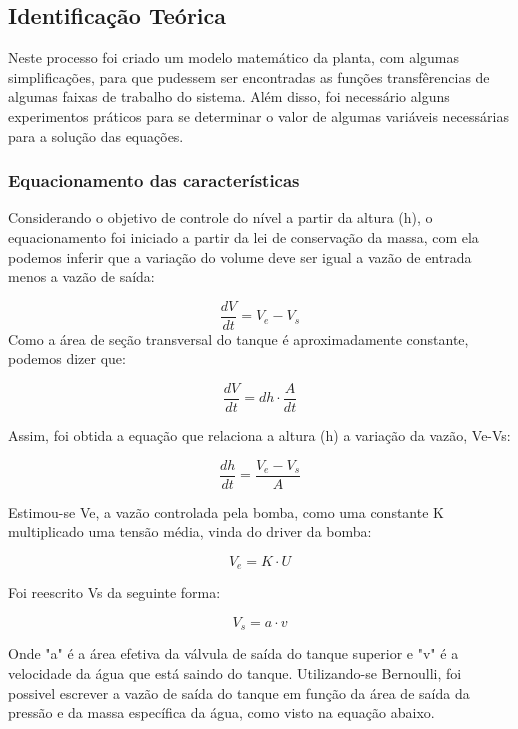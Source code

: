 \subsection{Identificação Teórica}

Neste processo foi criado um modelo matemático da planta, com algumas simplificações, para que pudessem ser encontradas as funções transfêrencias de algumas faixas de trabalho do sistema. Além disso, foi necessário alguns experimentos práticos para se determinar o valor de algumas variáveis necessárias para a solução das equações.

\subsubsection{Equacionamento das características}

Considerando o objetivo de controle do nível a partir da altura (h), o equacionamento foi iniciado a partir da lei de conservação da massa, com ela podemos inferir que a variação do volume deve ser igual a vazão de entrada menos a vazão de saída: 

\begin{equation}
    \dfrac{dV}{dt} = V_e - V_s
\end{equation}
Como a área de seção transversal do tanque é aproximadamente constante, podemos dizer que:


\begin{equation}
    \dfrac{dV}{dt} = dh \cdot \dfrac{A}{dt}
\end{equation}

Assim, foi obtida a equação que relaciona a altura (h) a variação da vazão, Ve-Vs:


\begin{equation}
    \dfrac{dh}{dt} = \dfrac{V_e - V_s}{A}
\end{equation}

Estimou-se Ve, a vazão controlada pela bomba, como uma constante K multiplicado uma tensão média, vinda do driver da bomba:


\begin{equation}
    V_e = K \cdot U
\end{equation}

Foi reescrito Vs da seguinte forma:

\begin{equation}
    V_s = a \cdot v
\end{equation}

Onde "a" é a área efetiva da válvula de saída do tanque superior e "v" é a velocidade da água que está saindo do tanque. Utilizando-se Bernoulli, foi possivel escrever a vazão de saída do  tanque em função da área de saída da pressão e da massa específica da água, como visto na equação abaixo.

